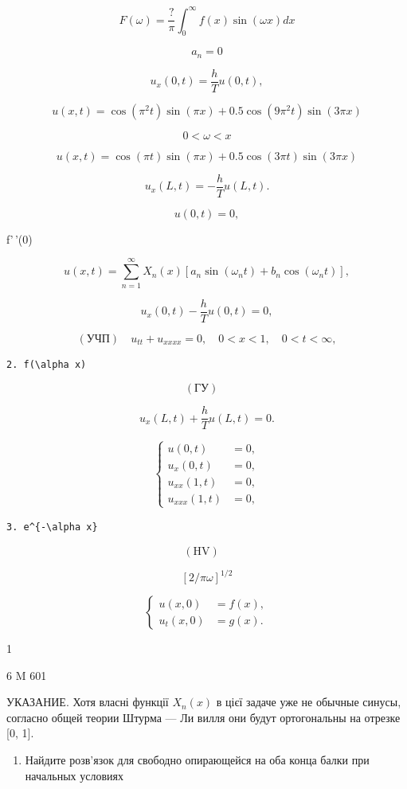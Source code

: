 \documentclass[
  ukrainian,
]{article}
\providecommand{\tightlist}{%
  \setlength{\itemsep}{0pt}\setlength{\parskip}{0pt}}
\begin{document}
\[
F(\omega) = \frac{?}{\pi} \int_{0}^{\infty} f(x) \sin(\omega x) dx
\]

\[
a_n=0
\]

\[
u_{x}(0, t) = \frac{h}{T} u(0, t),
\]

\[
u(x, t) = \cos(\pi^2 t) \sin(\pi x) + 0.5 \cos(9\pi^2 t) \sin(3\pi x)
\]

\[
0 < \omega < x
\]

\[
u(x, t) = \cos(\pi t) \sin(\pi x) + 0.5 \cos(3\pi t) \sin(3\pi x)
\]

\[
u_{x}(L, t) = -\frac{h}{T} u(L, t).
\]

\[
u(0, t) = 0,
\]

f'\,'(0)

\[
u(x, t) = \sum_{n=1}^{\infty} X_n(x) \left[ a_n \sin(\omega_n t) + b_n \cos(\omega_n t) \right],
\]

\[
u_{x}(0, t) - \frac{h}{T}u(0, t) = 0,
\]

\[
(\text{УЧП}) \quad u_{tt} + u_{xxxx} = 0, \quad 0 < x < 1, \quad 0 < t < \infty,
\]

\begin{verbatim}
2. f(\alpha x)
\end{verbatim}

\[
(\text{ГУ}) \quad
\]

\[
u_{x}(L, t) + \frac{h}{T}u(L, t) = 0.
\]

\[
\begin{cases} u(0, t) &= 0, \\ u_x(0, t) &= 0, \\ u_{xx}(1, t) &= 0, \\ u_{xxx}(1, t) &= 0, \end{cases}
\]

\begin{verbatim}
3. e^{-\alpha x}
\end{verbatim}

\[
(\text{HV}) \quad
\]

\[
[2/\pi\omega]^{1/2}
\]

\[
\begin{cases} u(x, 0) &= f(x), \\ u_t(x, 0) &= g(x). \end{cases}
\]

1

6 M 601

УКАЗАНИЕ. Хотя власні функції \(X_n(x)\) в цієї задаче уже не обычные
синусы, согласно общей теории Штурма --- Ли вилля они будут ортогональны
на отрезке {[}0, 1{]}.

\begin{enumerate}
\def\labelenumi{\arabic{enumi}.}
\setcounter{enumi}{1}
\tightlist
\item
  Найдите розв'язок для свободно опирающейся на оба конца балки при
  начальных условиях
\end{enumerate}
\end{document}
